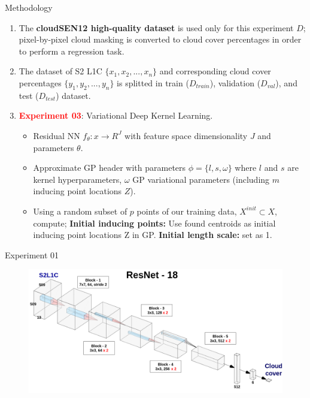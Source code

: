 \begin{frame}{Methodology}
	\begin{enumerate}
		\item  The \textbf{cloudSEN12 high-quality dataset} is used only for this experiment $D$; pixel-by-pixel cloud masking is converted to cloud cover percentages in order to perform a regression task.
		\item The dataset of S2 L1C $\{x_1, x_2, ..., x_n\}$ and corresponding cloud cover percentages $\{y_1, y_2, ..., y_n\}$ is splitted in train ($D_{train}$), validation ($D_{val}$), and test ($D_{test}$) dataset.
		\item \textcolor{red}{\textbf{Experiment 03}}: Variational Deep Kernel Learning.
		\begin{itemize}
			\item Residual NN $f_\theta: x \rightarrow R^J$ with feature space dimensionality $J$ and parameters $\theta$.			
			\item Approximate GP header with parameters $\phi = \{l, s, \omega\}$ where $l$ and $s$ are kernel hyperparameters, $\omega$ GP variational parameters (including $m$ inducing point locations $Z$).
			\item Using a random subset of $p$ points of our training
			data, $X^{init} \subset X$, compute; \textbf{Initial inducing points:} Use found centroids as initial inducing point locations Z in GP. \textbf{Initial length scale:} set
			as 1.			
		\end{itemize}
	\end{enumerate}
\end{frame}


\begin{frame}{Experiment 01}
\begin{figure}
	\centering
	\includegraphics[width=1\linewidth]{images/method_01}
	\caption{}
	\label{fig:method01}
\end{figure}
\end{frame}


